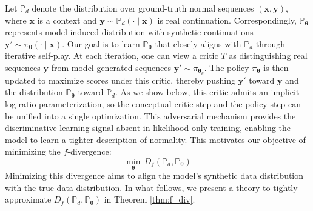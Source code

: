 Let $\mathbb{P}_d$ denote the distribution over ground-truth normal sequences $(\boldsymbol{x}, \boldsymbol{y})$, where $\boldsymbol{x}$ is a context and $\boldsymbol{y} \sim \mathbb{P}_d(\cdot \mid \boldsymbol{x})$ is real continuation. Correspondingly, $\mathbb{P}_{\boldsymbol{\theta}}$ represents model-induced distribution with synthetic continuations $\boldsymbol{y}' \sim \pi_{\boldsymbol{\theta}}(\cdot \mid \boldsymbol{x})$. Our goal is to learn $\mathbb{P}_{\boldsymbol{\theta}}$ that closely aligns with $\mathbb{P}_d$ through iterative self-play. At each iteration, one can view a critic $T$ as distinguishing real sequences $\boldsymbol{y}$ from model-generated sequences $\boldsymbol{y}' \sim \pi_{\boldsymbol{\theta}_k}$. The policy $\pi_{\boldsymbol{\theta}}$ is then updated to maximize scores under this critic, thereby pushing $\boldsymbol{y}'$ toward $\boldsymbol{y}$ and the distribution $\mathbb{P}_{\boldsymbol{\theta}}$ toward $\mathbb{P}_d$. As we show below, this critic admits an implicit log-ratio parameterization, so the conceptual critic step and the policy step can be unified into a single optimization. This adversarial mechanism provides the discriminative learning signal absent in likelihood-only training, 
enabling the model to learn a tighter description of normality. This motivates our objective of minimizing the $f$-divergence:
\begin{equation}
\min_{\boldsymbol{\theta}}\,D_{f}\left( \mathbb{P}_{d}, \mathbb{P}_{\boldsymbol{\theta}}\right)
\label{eq:main_op}
\end{equation}
Minimizing this divergence aims to align the model's synthetic data distribution with the true data distribution. In what follows, we present a theory to tightly approximate $D_f(\mathbb{P}_d, \mathbb{P}_{\boldsymbol{\theta}})$ in Theorem 
\ref{thm:f_div}.

